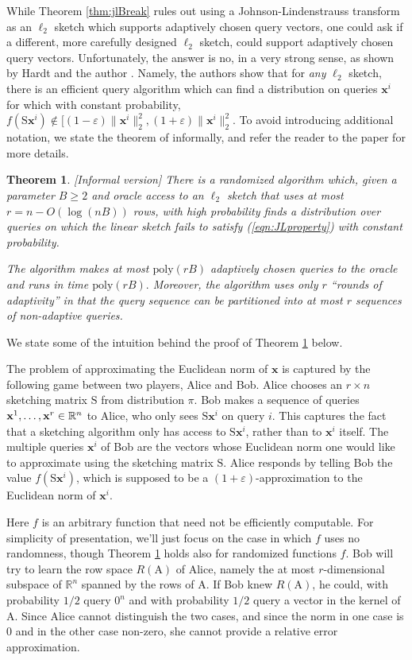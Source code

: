 \documentclass[11pt]{article}
\newcommand{\R}{\ensuremath\mathbb{R}}
\newtheorem{theorem}{Theorem}
\newcommand{\mat}[1]{{\ensuremath{\bm{\mathrm{#1}}}}}
\def\matA{\mat{A}}
\def\matS{\mat{S}}
\def\x{{\mathbf x}}
\newcommand{\eps}{\varepsilon}
\newcommand{\poly}{{\mathrm{poly}}}
\begin{document}
While Theorem \ref{thm:jlBreak} rules out using a Johnson-Lindenstrauss transform as an $\ell_2$ sketch
which supports adaptively chosen query vectors, one could ask if a different, more carefully designed
$\ell_2$ sketch, could support adaptively chosen query vectors. Unfortunately, the answer is no, in a very
strong sense, as shown by Hardt and the author \cite{hw13}. Namely, the authors show that for {\it any} $\ell_2$ sketch, there is
an efficient query algorithm which can find a distribution on queries $\x^i$ for which with constant
probability, $f(\matS\x^i) \notin [(1-\eps)\|\x^i\|_2^2, (1+\eps)\|\x^i\|_2^2$. To avoid introducing additional
notation, we state the theorem of \cite{hw13} informally, and refer the reader to the paper for more details.  

\begin{theorem}\label{thm:adaptive}[Informal version]
There is a randomized algorithm which, given a parameter $B\ge2$ and
oracle access to an $\ell_2$ sketch that uses at most $r=n-O(\log(nB))$
rows, with high probability finds a distribution over queries on which 
the linear sketch fails to satisfy (\ref{eqn:JLproperty}) with constant probability.

The algorithm makes at most $\poly(rB)$ adaptively chosen queries to the
oracle and runs in time $\poly(rB).$ Moreover, the algorithm uses only $r$
``rounds of adaptivity'' in that the query sequence can be partitioned into at
most $r$ sequences of non-adaptive queries.
\end{theorem}
We state some of the intuition behind the proof of Theorem \ref{thm:adaptive} below. 

The problem of approximating the Euclidean norm of $\x$ is captured 
by the following game between two
players, Alice and Bob. Alice chooses an $r \times n$ sketching matrix $\matS$ from
distribution $\pi$. Bob makes a sequence of queries $\x^1, \ldots, \x^r\in\R^n$ to
Alice, who only sees $\matS\x^i$ on query $i$. This captures the fact that a sketching
algorithm only has access to $\matS\x^i$, rather than to $\x^i$ itself. The multiple
queries $\x^i$ of Bob are the vectors whose Euclidean norm one would like to approximate
using the sketching matrix $\matS$. 
Alice responds by telling Bob the
value $f(\matS\x^i)$, which is supposed to be a $(1+\eps)$-approximation to the Euclidean
norm of $\x^i$. 

Here $f$ is an arbitrary function that 
need not be efficiently computable. For simplicity of presentation, we'll just focus
on the case in which $f$ uses no randomness, though Theorem \ref{thm:adaptive}
holds also for randomized functions $f$. 
Bob will try to learn the row space $R(\matA)$ of Alice, namely the at most
$r$-dimensional subspace of $\mathbb{R}^n$ spanned by the rows of $\matA$.  If Bob
knew $R(\matA)$, he could, with probability $1/2$ query $0^n$ and with probability
$1/2$ query a vector in the kernel of $\matA$. Since Alice cannot distinguish the
two cases, and since the norm in one case is $0$ and in the other case
non-zero, she cannot provide a relative error approximation. 
\end{document}
